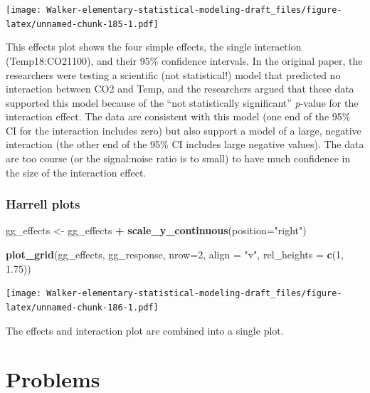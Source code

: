 \documentclass[]{book}
\newenvironment{Shaded}{\begin{snugshade}}{\end{snugshade}}
\newcommand{\DataTypeTok}[1]{\textcolor[rgb]{0.13,0.29,0.53}{#1}}
\newcommand{\DecValTok}[1]{\textcolor[rgb]{0.00,0.00,0.81}{#1}}
\newcommand{\FloatTok}[1]{\textcolor[rgb]{0.00,0.00,0.81}{#1}}
\newcommand{\KeywordTok}[1]{\textcolor[rgb]{0.13,0.29,0.53}{\textbf{#1}}}
\newcommand{\NormalTok}[1]{#1}
\newcommand{\OperatorTok}[1]{\textcolor[rgb]{0.81,0.36,0.00}{\textbf{#1}}}
\newcommand{\StringTok}[1]{\textcolor[rgb]{0.31,0.60,0.02}{#1}}
\begin{document}
\texttt{[image: Walker-elementary-statistical-modeling-draft\_files/figure-latex/unnamed-chunk-185-1.pdf]}

This effects plot shows the four simple effects, the single interaction (Temp18:CO21100), and their 95\% confidence intervals. In the original paper, the researchers were testing a scientific (not statistical!) model that predicted no interaction between CO2 and Temp, and the researchers argued that these data supported this model because of the ``not statistically significant'' \emph{p}-value for the interaction effect. The data are consistent with this model (one end of the 95\% CI for the interaction includes zero) but also support a model of a large, negative interaction (the other end of the 95\% CI includes large negative values). The data are too course (or the signal:noise ratio is to small) to have much confidence in the size of the interaction effect.

\hypertarget{harrell-plots}{%
\subsubsection{Harrell plots}\label{harrell-plots}}

\begin{Shaded}
\begin{Highlighting}[]
\NormalTok{gg_effects <-}\StringTok{ }\NormalTok{gg_effects }\OperatorTok{+}\StringTok{ }\KeywordTok{scale_y_continuous}\NormalTok{(}\DataTypeTok{position=}\StringTok{"right"}\NormalTok{)}

\KeywordTok{plot_grid}\NormalTok{(gg_effects, gg_response, }\DataTypeTok{nrow=}\DecValTok{2}\NormalTok{, }
          \DataTypeTok{align =} \StringTok{"v"}\NormalTok{, }
          \DataTypeTok{rel_heights =} \KeywordTok{c}\NormalTok{(}\DecValTok{1}\NormalTok{, }\FloatTok{1.75}\NormalTok{))}
\end{Highlighting}
\end{Shaded}

\texttt{[image: Walker-elementary-statistical-modeling-draft\_files/figure-latex/unnamed-chunk-186-1.pdf]}

The effects and interaction plot are combined into a single plot.

\hypertarget{problems-1}{%
\section{Problems}\label{problems-1}}
\end{document}
